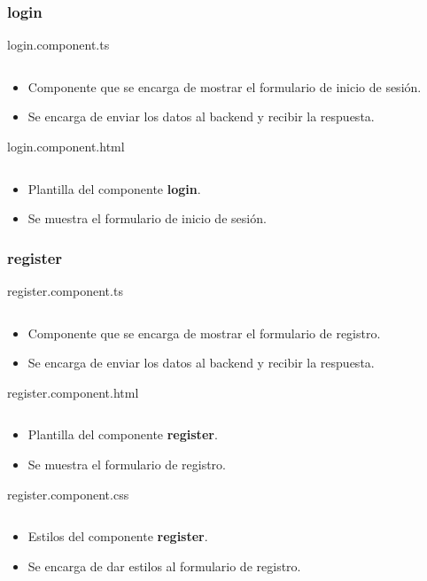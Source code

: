 \documentclass{article}
\newenvironment{block}{\captionsetup{type=listing}}{}
\begin{document}
\subsubsection{login}
\begin{block}
	\caption{login.component.ts}
	\inputminted{TypeScript}{kioskios_web/src/app/login/login.component.ts}
	\begin{itemize}
		\item Componente que se encarga de mostrar el formulario de inicio de sesión.
		\item Se encarga de enviar los datos al backend y recibir la respuesta.
	\end{itemize}

	\caption{login.component.html}
	\inputminted{HTML}{kioskios_web/src/app/login/login.component.html}
	\begin{itemize}
		\item Plantilla del componente \textbf{login}.
		\item Se muestra el formulario de inicio de sesión.
	\end{itemize}
\end{block}

\subsubsection{register}
\begin{block}
	\caption{register.component.ts}
	\inputminted{TypeScript}{kioskios_web/src/app/register/register.component.ts}
	\begin{itemize}
		\item Componente que se encarga de mostrar el formulario de registro.
		\item Se encarga de enviar los datos al backend y recibir la respuesta.
	\end{itemize}

	\caption{register.component.html}
	\inputminted{HTML}{kioskios_web/src/app/register/register.component.html}
	\begin{itemize}
		\item Plantilla del componente \textbf{register}.
		\item Se muestra el formulario de registro.
	\end{itemize}

	\caption{register.component.css}
	\inputminted{CSS}{kioskios_web/src/app/register/register.component.css}
	\begin{itemize}
		\item Estilos del componente \textbf{register}.
		\item Se encarga de dar estilos al formulario de registro.
	\end{itemize}
\end{block}
\end{document}
